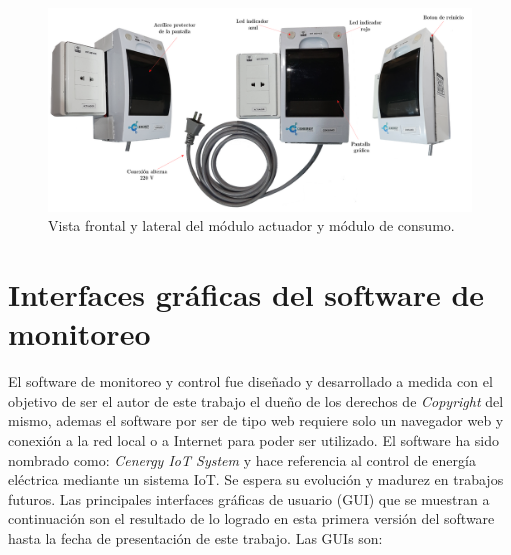 
\begin{landscape} %
\begin{figure}[htpb]
\centering 
\includegraphics[width=1.8\textwidth]{./Figures/consumo3.png}
\caption{Vista frontal y lateral del módulo actuador y módulo de consumo.}
\label{fig:modConsumo2}
\end{figure}
\end{landscape} %


\section{Interfaces gráficas del software de monitoreo}

El software de monitoreo y control fue diseñado y desarrollado a medida con el objetivo de ser el autor de este trabajo el dueño de los derechos de \emph{Copyright} del mismo, ademas el software por ser de tipo web requiere solo un navegador web y conexión a la red local o a Internet para poder ser utilizado. El software ha sido nombrado como: \emph{Cenergy IoT System} y hace referencia al control de energía eléctrica mediante un sistema IoT. Se espera su evolución y madurez en trabajos futuros. Las principales interfaces gráficas de usuario (GUI) que se muestran a continuación son el resultado de lo logrado en esta primera versión del software hasta la fecha de presentación de este trabajo. Las GUIs son:


